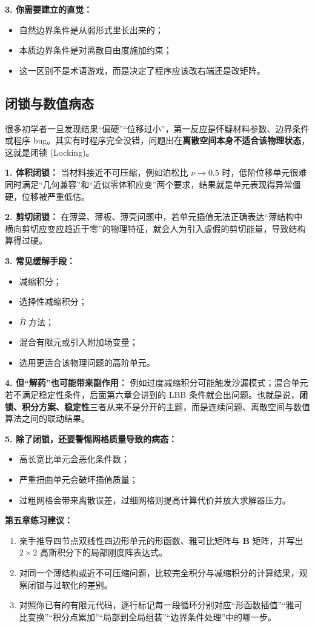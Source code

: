 \documentclass[11pt, a4paper, UTF8]{ctexart}
\begin{document}
\textbf{3. 你需要建立的直觉：}
\begin{itemize}
    \item 自然边界条件是从弱形式里长出来的；
    \item 本质边界条件是对离散自由度施加约束；
    \item 这一区别不是术语游戏，而是决定了程序应该改右端还是改矩阵。
\end{itemize}

\subsection{闭锁与数值病态}
很多初学者一旦发现结果“偏硬”“位移过小”，第一反应是怀疑材料参数、边界条件或程序 bug。其实有时程序完全没错，问题出在\textbf{离散空间本身不适合该物理状态}，这就是闭锁 (Locking)。

\textbf{1. 体积闭锁：}
当材料接近不可压缩，例如泊松比 $\nu \to 0.5$ 时，低阶位移单元很难同时满足“几何兼容”和“近似零体积应变”两个要求，结果就是单元表现得异常僵硬，位移被严重低估。

\textbf{2. 剪切闭锁：}
在薄梁、薄板、薄壳问题中，若单元插值无法正确表达“薄结构中横向剪切应变应趋近于零”的物理特征，就会人为引入虚假的剪切能量，导致结构算得过硬。

\textbf{3. 常见缓解手段：}
\begin{itemize}
    \item 减缩积分；
    \item 选择性减缩积分；
    \item $\bar{B}$ 方法；
    \item 混合有限元或引入附加场变量；
    \item 选用更适合该物理问题的高阶单元。
\end{itemize}

\textbf{4. 但“解药”也可能带来副作用：}
例如过度减缩积分可能触发沙漏模式；混合单元若不满足稳定性条件，后面第六章会讲到的 LBB 条件就会出问题。也就是说，\textbf{闭锁、积分方案、稳定性}三者从来不是分开的主题，而是连续问题、离散空间与数值算法之间的联动结果。

\textbf{5. 除了闭锁，还要警惕网格质量导致的病态：}
\begin{itemize}
    \item 高长宽比单元会恶化条件数；
    \item 严重扭曲单元会破坏插值质量；
    \item 过粗网格会带来离散误差，过细网格则提高计算代价并放大求解器压力。
\end{itemize}

\textbf{第五章练习建议：}
\begin{enumerate}
    \item 亲手推导四节点双线性四边形单元的形函数、雅可比矩阵与 $\bm{B}$ 矩阵，并写出 $2\times2$ 高斯积分下的局部刚度阵表达式。
    \item 对同一个薄结构或近不可压缩问题，比较完全积分与减缩积分的计算结果，观察闭锁与过软化的差别。
    \item 对照你已有的有限元代码，逐行标记每一段循环分别对应“形函数插值”“雅可比变换”“积分点累加”“局部到全局组装”“边界条件处理”中的哪一步。
\end{enumerate}
\end{document}
